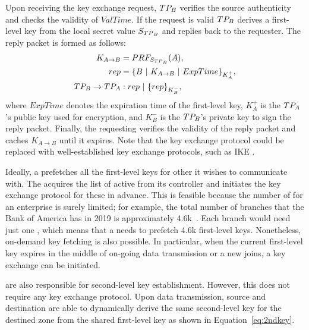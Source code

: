 Upon receiving the key exchange request, $TP_B$ verifies the source authenticity and 
checks the validity of $ValTime$. If the request is valid $TP_B$ derives a 
first-level key from the local secret value $S_{{TP}_B}$ and replies back to the requester.
The reply packet is formed as follows: 
\noindent 
\begin{subequations}
\begin{align}
K_{A \rightarrow B} & = PRF_{S_{{TP}_B}}(A), \\
rep & = \{B~|~K_{A \rightarrow B}~|~ExpTime\}_{K^+_A}, \\
TP_B \rightarrow TP_A & : rep~|~\{rep\}_{K^-_B},
\label{eq:rep}
\end{align}
\end{subequations}
\noindent 
where $ExpTime$ denotes the expiration time of the first-level key, $K^+_A$ is the 
$TP_A$'s public key used for encryption, and $K^-_B$ is the $TP_B$'s private key to 
sign the reply packet. Finally, the requesting \tp verifies the validity of the reply
packet and caches $K_{A \rightarrow B}$ until it expires. 
Note that the key exchange
protocol could be replaced with well-established key exchange protocols, such as IKE 
\cite{rfc7296}.

Ideally, a \tp prefetches all the first-level keys for other \tps it wishes to communicate 
with. The \tp acquires the list of active \tps from its controller and initiates the key 
exchange protocol for these \tps in advance. This is feasible because the number of \tps for
an enterprise is surely limited; for example, the total number of branches that the Bank of America has in 2019 is approximately 4.6k~\cite{statista2019boa}. 
Each branch would need just one \tp, which means that a \tp needs
to prefetch 4.6k first-level keys. Nonetheless, on-demand key fetching is also possible. 
In particular, when the current first-level key expires in the middle of on-going data
transmission or a new \tp joins, a key exchange can be initiated.

\tps are also responsible for second-level key establishment. However, this does not 
require any key exchange protocol. Upon data transmission, source and destination \tps 
are able to dynamically derive the same second-level key for the destined zone from the
shared first-level key as shown in Equation~\ref{eq:2ndkey}.





